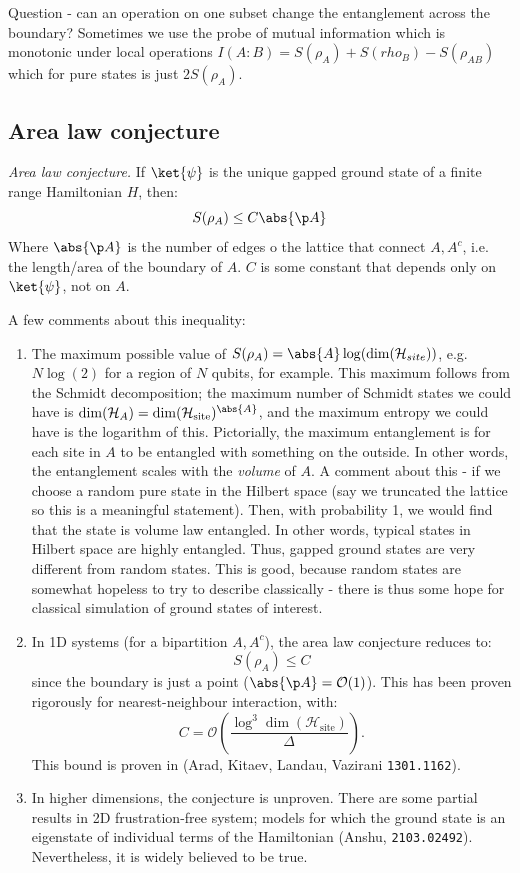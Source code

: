 Question - can an operation on one subset change the entanglement across the boundary? Sometimes we use the probe of mutual information which is monotonic under local operations $I(A:B) = S(\rho_A) + S(rho_B) - S(\rho_{AB})$ which for pure states is just $2S(\rho_A)$.

\subsection{Area law conjecture}
\emph{Area law conjecture.} If $\ket{\psi}$ is the unique gapped ground state of a finite range Hamiltonian $H$, then:
\begin{equation}
    S(\rho_A) \leq C\abs{\p A}
\end{equation}
Where $\abs{\p A}$ is the number of edges o the lattice that connect $A, A^c$, i.e. the length/area of the boundary of $A$. $C$ is some constant that depends only on $\ket{\psi}$, not on $A$.

A few comments about this inequality:
\begin{enumerate}
    \item The maximum possible value of $S(\rho_A) = \abs{A}\log(\dim(\mathcal{H}_{site}))$, e.g. $N\log(2)$ for a region of $N$ qubits, for example. This maximum follows from the Schmidt decomposition; the maximum number of Schmidt states we could have is $\dim(\mathcal{H}_A) = \dim(\mathcal{H}_{\text{site}})^{\abs{A}}$, and the maximum entropy we could have is the logarithm of this. Pictorially, the maximum entanglement is for each site in $A$ to be entangled with something on the outside. In other words, the entanglement scales with the \emph{volume} of $A$. A comment about this - if we choose a random pure state in the Hilbert space (say we truncated the lattice so this is a meaningful statement). Then, with probability 1, we would find that the state is volume law entangled. In other words, typical states in Hilbert space are highly entangled. Thus, gapped ground states are very different from random states. This is good, because random states are somewhat hopeless to try to describe classically - there is thus some hope for classical simulation of ground states of interest.
    \item In 1D systems (for a bipartition $A, A^c$), the area law conjecture reduces to:
    \begin{equation}
        S(\rho_A) \leq C
    \end{equation}
    since the boundary is just a point ($\abs{\p A} = \mathcal{O}(1)$). This has been proven rigorously for nearest-neighbour interaction, with:
    \begin{equation}
        C = \mathcal{O}(\frac{\log^3\dim(\mathcal{H}_{\text{site}})}{\Delta}).
    \end{equation}
    This bound is proven in (Arad, Kitaev, Landau, Vazirani \texttt{1301.1162}).
    \item In higher dimensions, the conjecture is unproven. There are some partial results in 2D frustration-free system; models for which the ground state is an eigenstate of individual terms of the Hamiltonian (Anshu, \texttt{2103.02492}). Nevertheless, it is widely believed to be true.
\end{enumerate}

